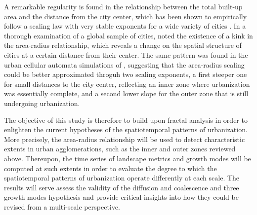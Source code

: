 A remarkable regularity is found in the relationship between the total built-up area and the distance from the city center, which has been shown to empirically follow a scaling law with very stable exponents for a wide variety of cities \citep{frankhauser1994fractalite, batty1994fractal}.
In a thorough examination of a global sample of cities, \cite{frankhauser1994fractalite} noted the existence of a kink in the area-radius relationship, which reveals a change on the spatial structure of cities at a certain distance from their center.
The same pattern was found in the urban cellular automata simulations of \cite{white1993cellular}, suggesting that the area-radius scaling could be better approximated throguh two scaling exponents, a first steeper one for small distances to the city center, reflecting an inner zone where urbanization was essentially complete, and a second lower slope for the outer zone that is still undergoing urbanization.

The objective of this study is therefore to build upon fractal analysis in order to enlighten the current hypotheses of the spatiotemporal patterns of urbanization.
More precisely, the area-radius relationship will be used to detect characteristic extents in urban agglomerations, such as the inner and outer zones reviewed above.
Thereupon, the time series of landscape metrics and growth modes will be computed at such extents in order to evaluate the degree to which the spatiotemporal patterns of urbanization operate differently at each scale.
The results will serve assess the validity of the diffusion and coalescence and three growth modes hypothesis and provide critical insights into how they could be revised from a multi-scale perspective.


